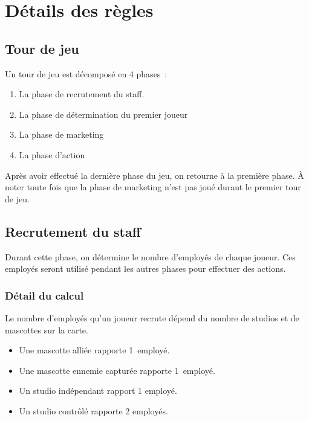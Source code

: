 \chapter{Détails des règles} \label{chapter:detail-regles}

        \section{Tour de jeu}

            Un tour de jeu est décomposé en 4 phases :

            \begin{enumerate}
                \item La phase de recrutement du staff.
                \item La phase de détermination du premier joueur
                \item La phase de marketing
                \item La phase d'action
            \end{enumerate}

            Après avoir effectué la dernière phase du jeu, on retourne à la première phase.
            À noter toute fois que la phase de marketing n'est pas joué durant le premier tour de jeu.

        \section{Recrutement du staff}
            Durant cette phase, on détermine le nombre d'employés de chaque joueur. Ces employés seront utilisé
            pendant les autres phases pour effectuer des actions.

            \subsection{Détail du calcul}
                Le nombre d'employés qu'un joueur recrute dépend du nombre de studios et de mascottes sur la carte.
                \begin{itemize}
                    \item Une mascotte alliée rapporte 1 employé.
                    \item Une mascotte ennemie capturée rapporte 1 employé.
                    \item Un studio indépendant rapport 1 employé.
                    \item Un studio contrôlé rapporte 2 employés.
                \end{itemize}

